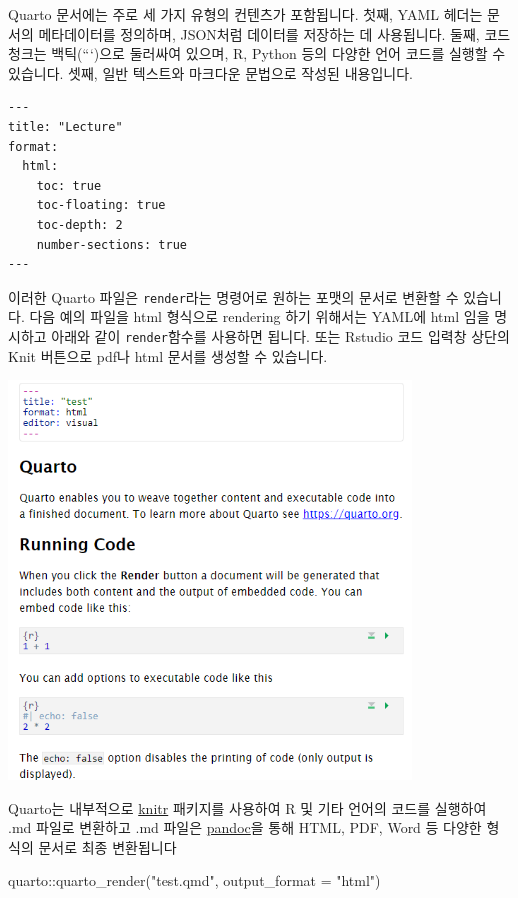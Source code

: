 \documentclass[
  a4paper,
]{book}
\newenvironment{Shaded}{\begin{snugshade}}{\end{snugshade}}
\newcommand{\AttributeTok}[1]{\textcolor[rgb]{0.40,0.45,0.13}{#1}}
\newcommand{\FunctionTok}[1]{\textcolor[rgb]{0.28,0.35,0.67}{#1}}
\newcommand{\NormalTok}[1]{\textcolor[rgb]{0.00,0.23,0.31}{#1}}
\newcommand{\SpecialCharTok}[1]{\textcolor[rgb]{0.37,0.37,0.37}{#1}}
\newcommand{\StringTok}[1]{\textcolor[rgb]{0.13,0.47,0.30}{#1}}
\begin{document}
Quarto 문서에는 주로 세 가지 유형의 컨텐츠가 포함됩니다. 첫째, YAML
헤더는 문서의 메타데이터를 정의하며, JSON처럼 데이터를 저장하는 데
사용됩니다. 둘째, 코드 청크는 백틱(```)으로 둘러싸여 있으며, R, Python
등의 다양한 언어 코드를 실행할 수 있습니다. 셋째, 일반 텍스트와 마크다운
문법으로 작성된 내용입니다.

\begin{verbatim}
---
title: "Lecture"
format: 
  html:
    toc: true
    toc-floating: true
    toc-depth: 2
    number-sections: true
---
\end{verbatim}

이러한 Quarto 파일은 \texttt{render}라는 명령어로 원하는 포맷의 문서로
변환할 수 있습니다. 다음 예의 파일을 html 형식으로 rendering 하기
위해서는 YAML에 html 임을 명시하고 아래와 같이 \texttt{render}함수를
사용하면 됩니다. 또는 Rstudio 코드 입력창 상단의 Knit 버튼으로 pdf나
html 문서를 생성할 수 있습니다.

\includegraphics[width=4.20833in,height=\textheight]{images/image-1500245979.png}

Quarto는 내부적으로 \href{https://yihui.org/knitr/}{knitr} 패키지를
사용하여 R 및 기타 언어의 코드를 실행하여 .md 파일로 변환하고 .md 파일은
\href{https://pandoc.org/}{pandoc}을 통해 HTML, PDF, Word 등 다양한
형식의 문서로 최종 변환됩니다

\begin{Shaded}
\begin{Highlighting}[]
\NormalTok{quarto}\SpecialCharTok{::}\FunctionTok{quarto\_render}\NormalTok{(}\StringTok{"test.qmd"}\NormalTok{, }\AttributeTok{output\_format =} \StringTok{"html"}\NormalTok{)}
\end{Highlighting}
\end{Shaded}
\end{document}
